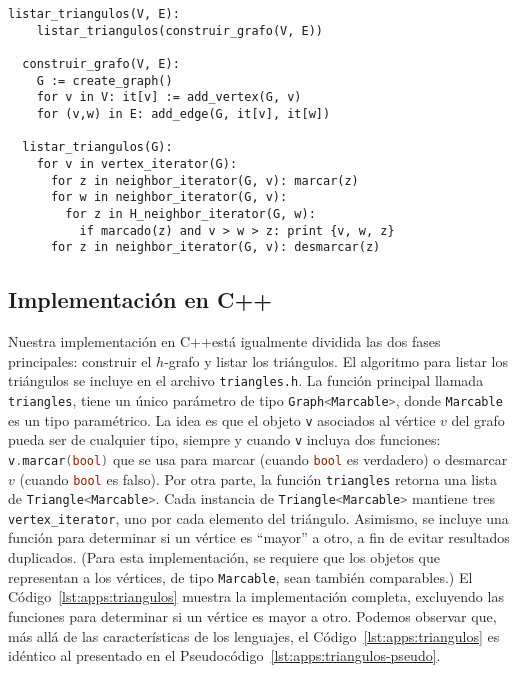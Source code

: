 \documentclass[%
    a4paper,%
    fontsize=12pt,%
    DIV=12,
    twoside,%
    openright,%
    titlepage=true,%
    headsepline,%
    toc=bibliography,%
    parskip=half,%
    cleardoublepage=empty,%
    headings=big,%
]{scrbook}
\makeatletter
\newcommand{\Code}[2][]{\lstinline[basicstyle={\ttfamily},#1]@#2@}
\newcommand{\CPPCode}[2][]{\lstinline[language=C++,basicstyle={\ttfamily},#1]@#2@}
\DeclareRobustCommand{\CPP}{C\nolinebreak[4]\hspace{-.05em}\raisebox{.4ex}{\relsize{-3}\textbf{++}}\xspace}
\def\CPP{C++}%
\makeatother
\begin{document}
\def\lstlistingname{Pseudocódigo}
\begin{lstlisting}[caption={Algoritmo de búsqueda de triángulos, incluyendo la construcción del $h$-grafo.},gobble=2,float=ht,label={lst:apps:triangulos-pseudo}]
  listar_triangulos(V, E):
    listar_triangulos(construir_grafo(V, E))
    
  construir_grafo(V, E):
    G := create_graph()
    for v in V: it[v] := add_vertex(G, v)
    for (v,w) in E: add_edge(G, it[v], it[w])
  
  listar_triangulos(G):
    for v in vertex_iterator(G):
      for z in neighbor_iterator(G, v): marcar(z) 
      for w in neighbor_iterator(G, v):
        for z in H_neighbor_iterator(G, w):
          if marcado(z) and v > w > z: print {v, w, z}
      for z in neighbor_iterator(G, v): desmarcar(z)
\end{lstlisting}

\subsection{Implementación en \CPP}

Nuestra implementación en \CPP está igualmente dividida las dos fases principales: construir el $h$-grafo y listar los triángulos.  El algoritmo para listar los triángulos se incluye en el archivo \Code{triangles.h}.  La función principal llamada \CPPCode{triangles}, tiene un único parámetro de tipo \CPPCode{Graph<Marcable>}, donde \CPPCode{Marcable} es un tipo paramétrico.  La idea es que el objeto \Code{v} asociados al vértice $v$ del grafo pueda ser de cualquier tipo, siempre y cuando \Code{v} incluya dos funciones: \CPPCode{v.marcar(bool)} que se usa para marcar (cuando \CPPCode{bool} es verdadero) o desmarcar $v$ (cuando \CPPCode{bool} es falso).  Por otra parte, la función \CPPCode{triangles} retorna una lista de \CPPCode{Triangle<Marcable>}.  Cada instancia de \CPPCode{Triangle<Marcable>} mantiene tres \CPPCode{vertex_iterator}, uno por cada elemento del triángulo.  Asimismo, se incluye una función para determinar si un vértice es ``mayor'' a otro, a fin de evitar resultados duplicados.  (Para esta implementación, se requiere que los objetos que representan a los vértices, de tipo \CPPCode{Marcable}, sean también comparables.)  El Código~\ref{lst:apps:triangulos} muestra la implementación completa, excluyendo las funciones para determinar si un vértice es mayor a otro.  Podemos observar que, más allá de las características de los lenguajes, el Código~\ref{lst:apps:triangulos} es idéntico al presentado en el Pseudocódigo~\ref{lst:apps:triangulos-pseudo}.
\end{document}
